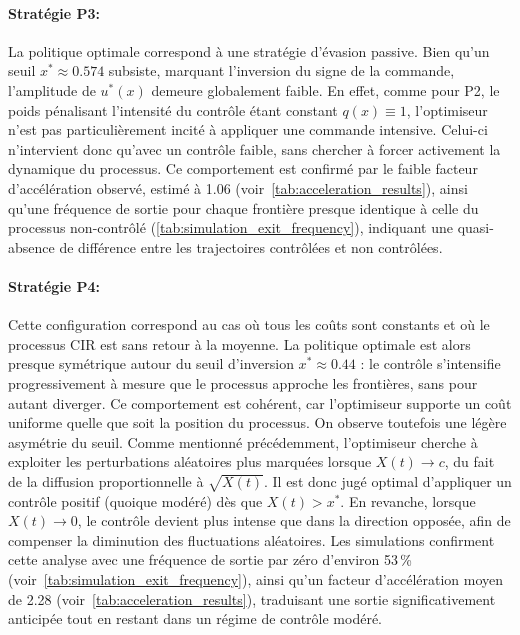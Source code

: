 \paragraph{Stratégie P3:} La politique optimale correspond à une stratégie d'évasion passive. Bien qu'un seuil \(x^*\approx0.574\) subsiste, marquant l'inversion du signe de la commande, l'amplitude de \(u^*(x)\) demeure globalement faible. En effet, comme pour P2,  le poids pénalisant l'intensité du contrôle étant constant \(q(x) \equiv 1\), l'optimiseur n'est pas particulièrement incité à appliquer une commande intensive. Celui-ci n'intervient donc qu'avec un contrôle faible, sans chercher à forcer activement la dynamique du processus. Ce comportement est confirmé par le faible facteur d'accélération observé, estimé à 1.06 (voir~\ref{tab:acceleration_results}), ainsi qu'une fréquence de sortie pour chaque frontière presque identique à celle du processus non-contrôlé (\ref{tab:simulation_exit_frequency}), indiquant une quasi-absence de différence entre les trajectoires contrôlées et non contrôlées.
\paragraph{Stratégie P4:} Cette configuration correspond au cas où tous les coûts sont constants et où le processus \acs{CIR} est sans retour à la moyenne. La politique optimale est alors presque symétrique autour du seuil d'inversion $x^* \approx 0.44$ : le contrôle s'intensifie progressivement à mesure que le processus approche les frontières, sans pour autant diverger. Ce comportement est cohérent, car l'optimiseur supporte un coût uniforme quelle que soit la position du processus. On observe toutefois une légère asymétrie du seuil. Comme mentionné précédemment, l'optimiseur cherche à exploiter les perturbations aléatoires plus marquées lorsque $X(t) \to c$, du fait de la diffusion proportionnelle à $\sqrt{X(t)}$. Il est donc jugé optimal d'appliquer un contrôle positif (quoique modéré) dès que $X(t) > x^*$. En revanche, lorsque $X(t) \to 0$, le contrôle devient plus intense que dans la direction opposée, afin de compenser la diminution des fluctuations aléatoires. Les simulations confirment cette analyse avec une fréquence de sortie par zéro d'environ 53\,\% (voir~\ref{tab:simulation_exit_frequency}), ainsi qu'un facteur d'accélération moyen de 2.28 (voir~\ref{tab:acceleration_results}), traduisant une sortie significativement anticipée tout en restant dans un régime de contrôle modéré.
